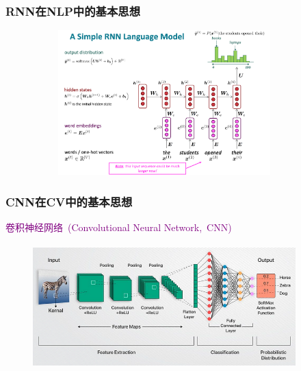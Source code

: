 \begin{frame}
	\frametitle{\textrm{RNN}在\textrm{NLP}中的基本思想}
\begin{figure}[h!]
\vspace*{-0.05in}
\centering
\includegraphics[height=2.2in, width=4.0in, viewport=0 0 1010 700,clip]{Figures/RNN-Language-model.png}
\label{RNN-language-model}
\end{figure}
\end{frame}

\begin{frame}
	\frametitle{\textrm{CNN}在\textrm{CV}中的基本思想}
	\textcolor{purple}{卷积神经网络~\textrm{(Convolutional Neural Network,~CNN)}}
\begin{figure}[h!]
\vspace*{-0.05in}
\centering
\includegraphics[height=1.9in, width=4.0in, viewport=0 0 720 324,clip]{Figures/CNN-CV-model.png}
\label{CNN-CV-model}
\end{figure}
\end{frame}


